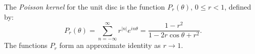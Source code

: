 The \textit{Poisson kernel} for the unit disc is the function $P_r(\theta)$, $0 \leq r < 1$, defined by:
\[
P_r(\theta) = \sum_{n=-\infty}^{\infty} r^{|n|} e^{in\theta}
= \frac{1 - r^2}{1 - 2r\cos\theta + r^2}.
\]
The functions $P_r$ form an approximate identity as $r \to 1$.
